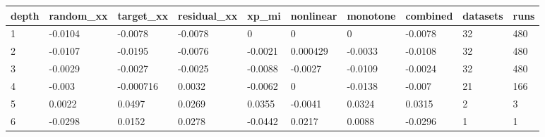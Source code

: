 \begin{tabular}{llllllllll}
\toprule
depth & random\_xx & target\_xx & residual\_xx & xp\_mi & nonlinear & monotone & combined & datasets & runs \\
\midrule
1 & -0.0104 & -0.0078 & -0.0078 & 0 & 0 & 0 & -0.0078 & 32 & 480 \\
2 & -0.0107 & -0.0195 & -0.0076 & -0.0021 & 0.000429 & -0.0033 & -0.0108 & 32 & 480 \\
3 & -0.0029 & -0.0027 & -0.0025 & -0.0088 & -0.0027 & -0.0109 & -0.0024 & 32 & 480 \\
4 & -0.003 & -0.000716 & 0.0032 & -0.0062 & 0 & -0.0138 & -0.007 & 21 & 166 \\
5 & 0.0022 & 0.0497 & 0.0269 & 0.0355 & -0.0041 & 0.0324 & 0.0315 & 2 & 3 \\
6 & -0.0298 & 0.0152 & 0.0278 & -0.0442 & 0.0217 & 0.0088 & -0.0296 & 1 & 1 \\
\bottomrule
\end{tabular}
